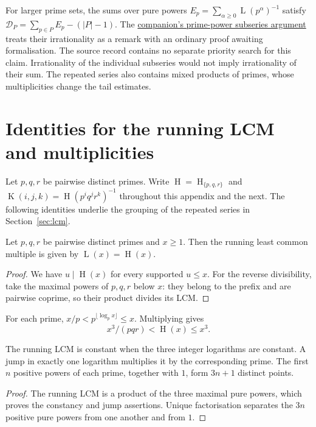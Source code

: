 \documentclass[11pt]{article}
\newcommand{\hgt}{\operatorname{H}}
\newcommand{\Lprefix}{\operatorname{L}}
\newcommand{\Kernel}{\operatorname{K}}
\newcommand{\longrecord}[2]{\href{erdos269-running-lcm-reasoning-surface.pdf\##1}{#2}}
\begin{document}
For larger prime sets, the sums over pure powers
$E_p=\sum_{\alpha\ge0}\Lprefix(p^\alpha)^{-1}$ satisfy
$\mathcal D_P=\sum_{p\in P}E_p-(|P|-1)$. The
\longrecord{r3-prime-subseries}{companion's prime-power subseries argument}
treats their irrationality as a remark with an ordinary proof awaiting
formalisation. The source record contains no separate priority search for
this claim. Irrationality of the individual subseries would not imply
irrationality of their sum. The repeated series also contains mixed
products of primes, whose multiplicities change the tail estimates.

\appendix
\section{Identities for the running LCM and multiplicities}\label{sec:height-identities}
\label{sec:cells}\label{sec:fibre}
Let $p,q,r$ be pairwise distinct primes. Write
$\hgt=\hgt_{\{p,q,r\}}$ and
$\Kernel(i,j,k)=\hgt(p^iq^jr^k)^{-1}$ throughout this appendix and
the next. The following identities underlie the grouping of the
repeated series in Section~\ref{sec:lcm}.

\begin{proposition}\label{res:lcm}
Let $p,q,r$ be pairwise distinct primes and $x\ge1$. Then the running
least common multiple is given by $\Lprefix(x)=\hgt(x)$.
\end{proposition}
\begin{proof}
We have $u\mid\hgt(x)$ for every supported $u\le x$. For the reverse
divisibility, take the maximal powers of $p,q,r$ below $x$: they belong
to the prefix and are pairwise coprime, so their product divides its LCM.
\end{proof}
For each prime, $x/p<p^{\lfloor\log_p x\rfloor}\le x$. Multiplying gives
\begin{equation}\label{res:cube}
 x^3/(pqr)<\hgt(x)\le x^3.
\end{equation}

\begin{proposition}\label{res:cell}
The running LCM is constant when the three integer logarithms are constant.
A jump in exactly one logarithm multiplies it by the corresponding prime.
The first $n$ positive powers of each prime, together with $1$, form
$3n+1$ distinct points.
\end{proposition}
\begin{proof}
The running LCM is a product of the three maximal pure powers, which proves
the constancy and jump assertions. Unique factorisation separates the
$3n$ positive pure powers from one another and from $1$.
\end{proof}
\end{document}
